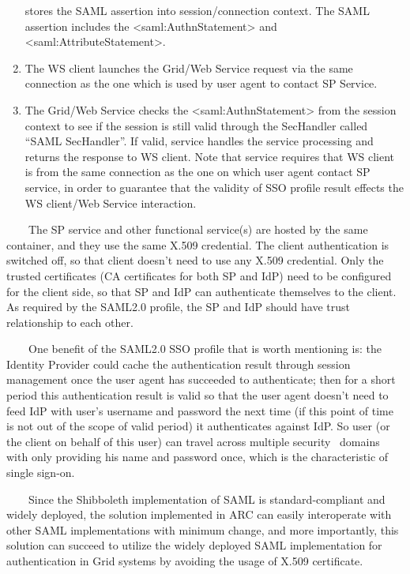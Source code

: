 \documentclass{article}
\begin{document}
\begin{enumerate}
{stores the SAML assertion into session/connection context. The SAML
assertion includes the {\textless}saml:AuthnStatement{\textgreater} and
{\textless}saml:AttributeStatement{\textgreater}.}
\item {\color{black}
The WS client launches the Grid/Web Service request via the same
connection as the one which is used by user agent to contact SP
Service.}
\item {\color{black}
The Grid/Web Service checks the
{\textless}saml:AuthnStatement{\textgreater} from the session context
to see if the session is still valid through the SecHandler called
{\textquotedblleft}SAML SecHandler{\textquotedblright}. If valid,
service handles the service processing and returns the response to WS
client. Note that service requires that WS client is from the same
connection as the one on which user agent contact SP service, in order
to guarantee that the validity of SSO profile result effects the WS
client/Web Service interaction.}
\end{enumerate}
{\upshape\color{black}
\ \ \ \ The SP service and other functional service(s) are hosted by the
same container, and they use the same X.509 credential. The client
authentication is switched off, so that client doesn{\textquoteright}t
need to use any X.509 credential. Only the trusted certificates (CA
certificates for both SP and IdP) need to be configured for the client
side, so that SP and IdP can authenticate themselves to the client. As
required by the SAML2.0 profile, the SP and IdP should have trust
relationship to each other.}

{\upshape\color{black}
\ \ \ \ One benefit of the SAML2.0 SSO profile that is worth mentioning
is: the Identity Provider could cache the authentication result through
session management once the user agent has succeeded to authenticate;
then for a short period this authentication result is valid so that the
user agent doesn{\textquoteright}t need to feed IdP with
user{\textquoteright}s username and password the next time (if this
point of time is not out of the scope of valid period) it authenticates
against IdP. So user (or the client on behalf of this user) can travel
across multiple security \ domains with only providing his name and
password once, which is the characteristic of single sign-on.}

{\upshape\color{black}
\ \ \ \ Since the Shibboleth implementation of SAML is
standard-compliant and widely deployed, the solution implemented in ARC
can easily interoperate with other SAML implementations with minimum
change, and more importantly, this solution can succeed to utilize the
widely deployed SAML implementation for authentication in Grid systems
by avoiding the usage of X.509 certificate.}
\end{document}
